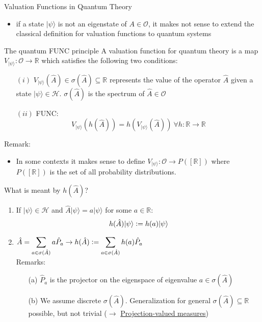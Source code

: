 \documentclass{beamer}
\DeclareMathOperator*{\SumInt}{%
\mathchoice%
  {\ooalign{$\displaystyle\sum$\cr\hidewidth$\displaystyle\int$\hidewidth\cr}}
  {\ooalign{\raisebox{.14\height}{\scalebox{.7}{$\textstyle\sum$}}\cr\hidewidth$\textstyle\int$\hidewidth\cr}}
  {\ooalign{\raisebox{.2\height}{\scalebox{.6}{$\scriptstyle\sum$}}\cr$\scriptstyle\int$\cr}}
  {\ooalign{\raisebox{.2\height}{\scalebox{.6}{$\scriptstyle\sum$}}\cr$\scriptstyle\int$\cr}}
}
\newcommand{\defeq}{\vcentcolon=}
\newcommand{\R}{\mathbb{R}}
\begin{document}
\begin{frame}{Valuation Functions in Quantum Theory}
\begin{itemize}
\item if a state $|\psi\rangle$ is not an eigenstate of $A\in\mathcal O$, it makes not sense to extend the classical definition for valuation functions to quantum systems
\end{itemize}

\begin{block}{The quantum FUNC principle}
A valuation function for quantum theory is a map $V_{|\psi\rangle}:\mathcal O\rightarrow\R$ which satisfies the following two conditions:
\begin{itemize}
\item [$(i)$] $V_{|\psi\rangle}(\hat A)\in\sigma(\hat A)\subseteq\R$ represents the value of the operator $\hat A$ given a state $|\psi\rangle\in\mathcal H$. $\sigma(\hat A)$ is the spectrum of $\hat A\in\mathcal O$
\item [$(ii)$] FUNC: 
$$
V_{|\psi\rangle}(h(\hat A))=h(V_{|\psi\rangle}(\hat A))\ \forall h:\R\rightarrow\R
$$
\end{itemize}
\end{block}
\vfill
Remark:
\begin{itemize}
\item In some contexts it makes sense to define $V_{|\psi\rangle}:\mathcal O\rightarrow P([\R])$ where $P([\R])$ is the set of all probability distributions.
\end{itemize}
\end{frame}

\begin{frame}{What is meant by $h(\hat A)$?}
\begin{enumerate}
\item If $|\psi\rangle\in\mathcal H$ and $\hat A|\psi\rangle=a|\psi\rangle$ for some $a\in\R$:
$$
h(\hat A)|\psi\rangle\defeq h(a)|\psi\rangle
$$
\item $\hat A=\displaystyle\sum\limits_{a\in\sigma(\hat A)}a  \hat P_a\rightarrow  h(\hat A)\defeq\displaystyle\sum\limits_{a\in\sigma(\hat A)}h(a)  \hat P_a$\\ %
\vfill
Remarks:
\begin{itemize}
\item [(a)] $\hat P_a$ is the projector on the eigenspace of eigenvalue $a\in\sigma(\hat A)$
\item [(b)] We assume discrete $\sigma(\hat A)$. Generalization for general $\sigma(\hat A)\subseteq\R$ possible, but not trivial ($\rightarrow$ \href{https://en.wikipedia.org/wiki/Projection-valued_measure}{Projection-valued measures})
\end{itemize}
\end{enumerate}
\end{frame}
\end{document}
